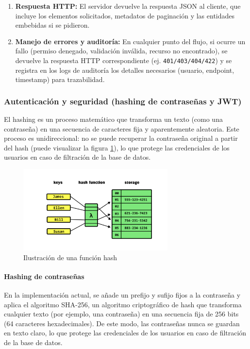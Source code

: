 \documentclass[12pt, a4paper]{article}
\begin{document}
\begin{enumerate}
	\item \textbf{Respuesta HTTP:} El servidor devuelve la respuesta JSON al cliente, que incluye los elementos solicitados, metadatos de paginación y las entidades embebidas si se pidieron.
	\item \textbf{Manejo de errores y auditoría:} En cualquier punto del flujo, si ocurre un fallo (permiso denegado, validación inválida, recurso no encontrado), se devuelve la respuesta HTTP correspondiente (ej. \texttt{401/403/404/422}) y se registra en los logs de auditoría los detalles necesarios (usuario, endpoint, timestamp) para trazabilidad.
\end{enumerate}


\subsubsection{Autenticación y seguridad (hashing de contraseñas y JWT)}

El hashing es un proceso matemático que transforma un texto (como una contraseña) en una secuencia de caracteres fija y aparentemente aleatoria. Este proceso es unidireccional: no se puede recuperar la contraseña original a partir del hash (puede visualizar la figura \ref{fig:hash}), lo que protege las credenciales de los usuarios en caso de filtración de la base de datos.


\begin{figure}[htbp]
	\centering
	\includegraphics[width=0.7\textwidth]{images/hash.png}
	\caption[Ejemplo]{Ilustración de una función hash }
	\label{fig:hash}
\end{figure}
\vspace{-10pt}

\paragraph{Hashing de contraseñas}
En la implementación actual, se añade un prefijo y sufijo fijos a la contraseña y aplica el algoritmo SHA-256, un algoritmo criptográfico de hash que transforma cualquier texto (por ejemplo, una contraseña) en una secuencia fija de 256 bits (64 caracteres hexadecimales). De este modo, las contraseñas nunca se guardan en texto claro, lo que protege las credenciales de los usuarios en caso de filtración de la base de datos.
\end{document}
